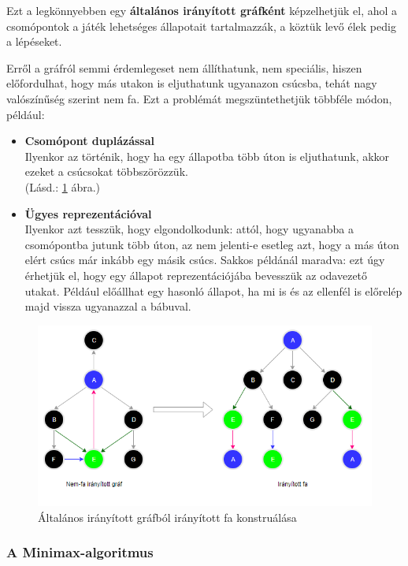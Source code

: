 \documentclass[twoside, a4paper, 12pt]{article}
\begin{document}
Ezt a legkönnyebben egy \textbf{általános irányított gráfként} képzelhetjük el, ahol a csomópontok a játék lehetséges állapotait tartalmazzák, a köztük levő élek pedig a lépéseket.

Erről a gráfról semmi érdemlegeset nem állíthatunk, nem speciális, hiszen előfordulhat, hogy más utakon is eljuthatunk ugyanazon csúcsba, tehát nagy valószínűség szerint nem fa. Ezt a problémát megszüntethetjük többféle módon, például: 

\begin{itemize}
	\item \textbf{Csomópont duplázással} \\
	Ilyenkor az történik, hogy ha egy állapotba több úton is eljuthatunk, akkor ezeket a csúcsokat többszörözzük. \\
	(Lásd.: \ref{fig:game-graph-transformation} ábra.)
	
	\item \textbf{Ügyes reprezentációval} \\
	Ilyenkor azt tesszük, hogy elgondolkodunk: attól, hogy ugyanabba a csomópontba jutunk több úton, az nem jelenti-e esetleg azt, hogy a más úton elért csúcs már inkább egy másik csúcs. Sakkos példánál maradva: ezt úgy érhetjük el, hogy egy állapot reprezentációjába bevesszük az odavezető utakat. Például előállhat egy hasonló állapot, ha mi is és az ellenfél is előrelép majd vissza ugyanazzal a bábuval.
\end{itemize}

\begin{figure}[htbp]
	\centering
	\includegraphics[width=1.0\textwidth]{img/game-graph-transformation.png}
	\caption{Általános irányított gráfból irányított fa konstruálása}
	\label{fig:game-graph-transformation}
\end{figure}

\subsubsection{A Minimax-algoritmus}
\lipsum[1]
\end{document}
